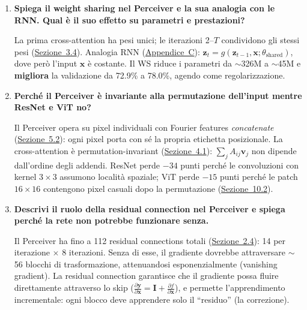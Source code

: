 \documentclass[12pt,a4paper]{article}
\begin{document}
\begin{enumerate}[label=\textbf{D\arabic*.}]
\item \textbf{Spiega il weight sharing nel Perceiver e la sua analogia con le RNN. Qual \`e il suo effetto su parametri e prestazioni?}

\begin{proofbox}
La prima cross-attention ha pesi unici; le iterazioni 2--$T$ condividono gli stessi pesi (\hyperref[sec:iterative]{Sezione~3.4}). Analogia RNN (\hyperref[app:rnn]{Appendice~C}): $\mathbf{z}_t = g(\mathbf{z}_{t-1}, \mathbf{x}; \theta_{\text{shared}})$, dove per\`o l'input $\mathbf{x}$ \`e costante. Il WS riduce i parametri da $\sim$326M a $\sim$45M e \textbf{migliora} la validazione da 72.9\% a 78.0\%, agendo come regolarizzazione.
\end{proofbox}

\item \textbf{Perch\'e il Perceiver \`e invariante alla permutazione dell'input mentre ResNet e ViT no?}

\begin{proofbox}
Il Perceiver opera su pixel individuali con Fourier features \emph{concatenate} (\hyperref[sec:fourier_forward]{Sezione~5.2}): ogni pixel porta con s\'e la propria etichetta posizionale. La cross-attention \`e permutation-invariant (\hyperref[sec:perm_invariance]{Sezione~4.1}): $\sum_j A_{ij} \mathbf{v}_j$ non dipende dall'ordine degli addendi. ResNet perde $-34$ punti perch\'e le convoluzioni con kernel $3 \times 3$ assumono localit\`a spaziale; ViT perde $-15$ punti perch\'e le patch $16 \times 16$ contengono pixel casuali dopo la permutazione (\hyperref[sec:imagenet_perm]{Sezione~10.2}).
\end{proofbox}

\item \textbf{Descrivi il ruolo della residual connection nel Perceiver e spiega perch\'e la rete non potrebbe funzionare senza.}

\begin{proofbox}
Il Perceiver ha fino a 112 residual connections totali (\hyperref[sec:residual]{Sezione~2.4}): 14 per iterazione $\times$ 8 iterazioni. Senza di esse, il gradiente dovrebbe attraversare $\sim$56 blocchi di trasformazione, attenuandosi esponenzialmente (vanishing gradient). La residual connection garantisce che il gradiente possa fluire direttamente attraverso lo skip ($\frac{\partial \mathbf{y}}{\partial \mathbf{x}} = \mathbf{I} + \frac{\partial f}{\partial \mathbf{x}}$), e permette l'apprendimento incrementale: ogni blocco deve apprendere solo il ``residuo'' (la correzione).
\end{proofbox}

\end{enumerate}
\end{document}
